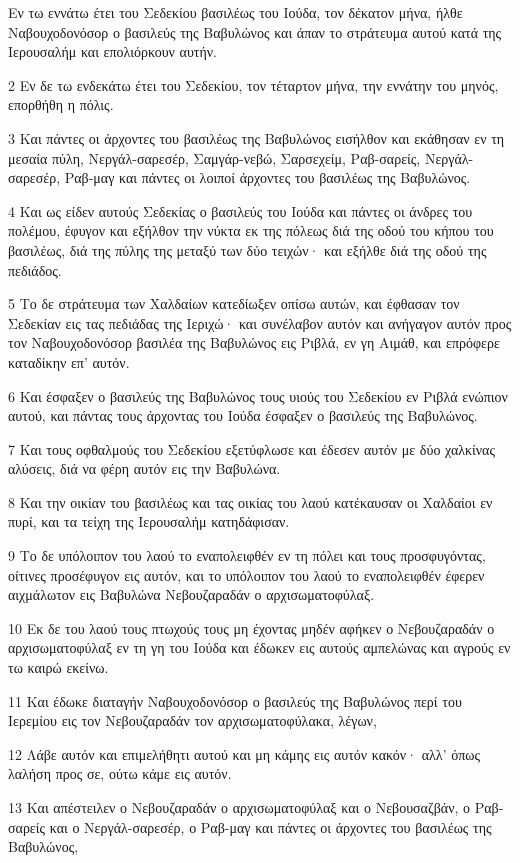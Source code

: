 \par Εν τω εννάτω έτει του Σεδεκίου βασιλέως του Ιούδα, τον δέκατον μήνα, ήλθε Ναβουχοδονόσορ ο βασιλεύς της Βαβυλώνος και άπαν το στράτευμα αυτού κατά της Ιερουσαλήμ και επολιόρκουν αυτήν.
\par 2 Εν δε τω ενδεκάτω έτει του Σεδεκίου, τον τέταρτον μήνα, την εννάτην του μηνός, επορθήθη η πόλις.
\par 3 Και πάντες οι άρχοντες του βασιλέως της Βαβυλώνος εισήλθον και εκάθησαν εν τη μεσαία πύλη, Νεργάλ-σαρεσέρ, Σαμγάρ-νεβώ, Σαρσεχείμ, Ραβ-σαρείς, Νεργάλ-σαρεσέρ, Ραβ-μαγ και πάντες οι λοιποί άρχοντες του βασιλέως της Βαβυλώνος.
\par 4 Και ως είδεν αυτούς Σεδεκίας ο βασιλεύς του Ιούδα και πάντες οι άνδρες του πολέμου, έφυγον και εξήλθον την νύκτα εκ της πόλεως διά της οδού του κήπου του βασιλέως, διά της πύλης της μεταξύ των δύο τειχών· και εξήλθε διά της οδού της πεδιάδος.
\par 5 Το δε στράτευμα των Χαλδαίων κατεδίωξεν οπίσω αυτών, και έφθασαν τον Σεδεκίαν εις τας πεδιάδας της Ιεριχώ· και συνέλαβον αυτόν και ανήγαγον αυτόν προς τον Ναβουχοδονόσορ βασιλέα της Βαβυλώνος εις Ριβλά, εν γη Αιμάθ, και επρόφερε καταδίκην επ' αυτόν.
\par 6 Και έσφαξεν ο βασιλεύς της Βαβυλώνος τους υιούς του Σεδεκίου εν Ριβλά ενώπιον αυτού, και πάντας τους άρχοντας του Ιούδα έσφαξεν ο βασιλεύς της Βαβυλώνος.
\par 7 Και τους οφθαλμούς του Σεδεκίου εξετύφλωσε και έδεσεν αυτόν με δύο χαλκίνας αλύσεις, διά να φέρη αυτόν εις την Βαβυλώνα.
\par 8 Και την οικίαν του βασιλέως και τας οικίας του λαού κατέκαυσαν οι Χαλδαίοι εν πυρί, και τα τείχη της Ιερουσαλήμ κατηδάφισαν.
\par 9 Το δε υπόλοιπον του λαού το εναπολειφθέν εν τη πόλει και τους προσφυγόντας, οίτινες προσέφυγον εις αυτόν, και το υπόλοιπον του λαού το εναπολειφθέν έφερεν αιχμάλωτον εις Βαβυλώνα Νεβουζαραδάν ο αρχισωματοφύλαξ.
\par 10 Εκ δε του λαού τους πτωχούς τους μη έχοντας μηδέν αφήκεν ο Νεβουζαραδάν ο αρχισωματοφύλαξ εν τη γη του Ιούδα και έδωκεν εις αυτούς αμπελώνας και αγρούς εν τω καιρώ εκείνω.
\par 11 Και έδωκε διαταγήν Ναβουχοδονόσορ ο βασιλεύς της Βαβυλώνος περί του Ιερεμίου εις τον Νεβουζαραδάν τον αρχισωματοφύλακα, λέγων,
\par 12 Λάβε αυτόν και επιμελήθητι αυτού και μη κάμης εις αυτόν κακόν· αλλ' όπως λαλήση προς σε, ούτω κάμε εις αυτόν.
\par 13 Και απέστειλεν ο Νεβουζαραδάν ο αρχισωματοφύλαξ και ο Νεβουσαζβάν, ο Ραβ-σαρείς και ο Νεργάλ-σαρεσέρ, ο Ραβ-μαγ και πάντες οι άρχοντες του βασιλέως της Βαβυλώνος,
